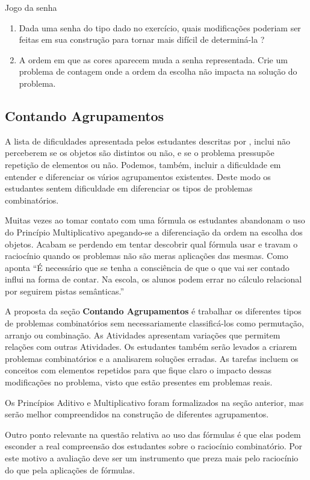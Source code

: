 \begin{task}{Jogo da senha}
\begin{enumerate}
\item Dada uma senha do tipo dado no exercício, quais modificações poderiam ser feitas em sua construção para tornar mais difícil de determiná-la ?

\item A ordem em que as cores aparecem muda a senha representada. Crie um problema de contagem onde a ordem da escolha não impacta na solução do problema.
\end{enumerate}


\end{task}
\clearpage
\def\currentcolor{session1}
\begin{texto}
{
  \section{Contando Agrupamentos}

A lista de dificuldades apresentada pelos estudantes descritas por \cite{Renan}, inclui não perceberem se os objetos são distintos ou não, e se o problema pressupõe repetição de elementos ou não. Podemos, também, incluir a dificuldade em entender e diferenciar os vários agrupamentos existentes. Deste modo os estudantes sentem dificuldade em diferenciar os tipos de problemas combinatórios. 

Muitas vezes ao tomar contato com uma fórmula os estudantes abandonam o uso do Princípio Multiplicativo apegando-se a diferenciação da ordem na escolha dos objetos. Acabam se perdendo em tentar descobrir qual fórmula usar e travam o raciocínio quando os problemas não são meras aplicações das mesmas. Como aponta \cite{Cristiane} ``É necessário que se tenha a consciência de que o que vai ser   contado influi na forma de contar. Na escola, os alunos podem errar no cálculo relacional por seguirem pistas semânticas.''

A proposta da seção \textbf{Contando Agrupamentos} é trabalhar os diferentes tipos de problemas combinatórios sem necessariamente classificá-los como permutação, arranjo ou combinação. As Atividades apresentam variações que permitem relações com outras Atividades. Os estudantes também serão levados a criarem problemas combinatórios e a analisarem soluções erradas. As tarefas incluem os conceitos com elementos repetidos para que fique claro o impacto dessas modificações no problema, visto que estão presentes em problemas reais.

Os Princípios Aditivo e Multiplicativo foram formalizados na seção anterior, mas serão melhor compreendidos na construção de diferentes agrupamentos.

Outro ponto relevante na questão relativa ao uso das fórmulas é que elas podem esconder a real compreensão dos estudantes sobre o raciocínio combinatório. Por este motivo a avaliação deve ser um instrumento que preza mais pelo raciocínio do que pela aplicações de fórmulas.
}
\end{texto}
